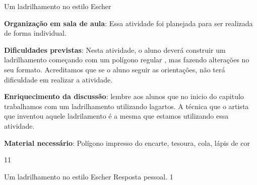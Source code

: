 \begin{sugestions}{Um ladrilhamento no estilo Escher}
{
	\textbf{Organização em sala de aula}: Essa atividade foi planejada para ser realizada de forma individual. 

	\textbf{Dificuldades previstas}: Nesta atividade, o aluno deverá construir um  ladrilhamento começando com um polígono regular , mas fazendo alterações no seu formato.  Acreditamos que se o aluno seguir as orientações, não terá dificuldade em realizar a atividade.

	\textbf{Enriquecimento da discussão}: lembre aos alunos que no inicio do capitulo trabalhamos com um ladrilhamento utilizando lagartos. A técnica que o artista que inventou aquele ladrilamento é a mesma que estamos utilizando essa atividade. 

	\textbf{Material necessário}: Polígono impresso do encarte, tesoura, cola, lápis de cor
}{1}{1}
\end{sugestions}
\begin{answer}{Um ladrilhamento no estilo Escher}
{
	Resposta pessoal.
}{1}
\end{answer}





